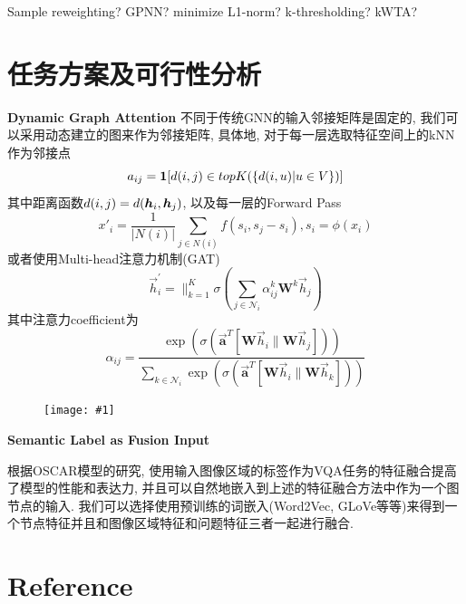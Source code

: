 \documentclass{article}
\newcommand{\cfig}[2]{
    \begin{figure}[htbp]
    \centering
    \texttt{[image: \#1]}
\end{figure}
}
\begin{document}
Sample reweighting? GPNN? minimize L1-norm? k-thresholding? kWTA?

\section{任务方案及可行性分析}

\textbf{Dynamic Graph Attention} 不同于传统GNN的输入邻接矩阵是固定的, 我们可以采用动态建立的图来作为邻接矩阵, 具体地, 对于每一层选取特征空间上的kNN作为邻接点
\begin{equation}
    a_{ij}=\boldsymbol{1}[d(i,j)\in topK(\{d(i, u)| u\in V\})]
\end{equation}
其中距离函数$d(i,j)=d(\boldsymbol{h}_i, \boldsymbol{h}_j)$,
以及每一层的Forward Pass
\begin{equation}
    x'_i = \frac 1 {|N(i)|} \sum_{j\in N(i)} f(s_i, s_j-s_i), s_i = \phi(x_i)
\end{equation}
或者使用Multi-head注意力机制(GAT)
\begin{equation}
    \vec{h}_{i}^{\prime}=\|_{k=1}^{K} \sigma\left(\sum_{j \in \mathcal{N}_{i}} \alpha_{i j}^{k} \mathbf{W}^{k} \vec{h}_{j}\right)
\end{equation}
其中注意力coefficient为
\begin{equation}
    \alpha_{i j}=\frac{\exp \left( \sigma \left(\overrightarrow{\mathbf{a}}^{T}\left[\mathbf{W} \vec{h}_{i} \| \mathbf{W} \vec{h}_{j}\right]\right)\right)}{\sum_{k \in \mathcal{N}_{i}} \exp \left( \sigma \left(\overrightarrow{\mathbf{a}}^{T}\left[\mathbf{W} \vec{h}_{i} \| \mathbf{W} \vec{h}_{k}\right]\right)\right)}
\end{equation}

\cfig{gat-arch.png}{1.0}

\textbf{Semantic Label as Fusion Input}

根据OSCAR模型的研究, 使用输入图像区域的标签作为VQA任务的特征融合提高了模型的性能和表达力, 并且可以自然地嵌入到上述的特征融合方法中作为一个图节点的输入. 我们可以选择使用预训练的词嵌入(Word2Vec, GLoVe等等)来得到一个节点特征并且和图像区域特征和问题特征三者一起进行融合.


\section{Reference}
\end{document}
